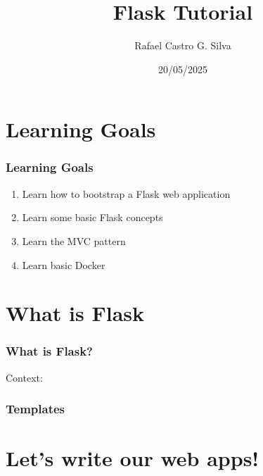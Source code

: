 \documentclass[fleqn,aspectratio=169,10pt]{beamer}
\title[Flask Tutorial]{Flask Tutorial}
\author[Rafael]{Rafael Castro G. Silva}
\date{20/05/2025}
\institute[UCPH]{
  Department of Computer Science \\
  University of Copenhagen}
\begin{document}

\begin{frame}
  \titlepage
\end{frame}

\section{Learning Goals}

\begin{frame}
  \frametitle{Learning Goals}
  \begin{enumerate}
    \item Learn how to bootstrap a Flask web application
    \item Learn some basic Flask concepts
    \item Learn the MVC pattern
    \item Learn basic Docker
  \end{enumerate}
\end{frame}

\section{What is Flask}

\begin{frame}[fragile]
  \frametitle{What is Flask?}
  \begin{block}{Context:}
  \begin{itemize}
  \end{itemize}
  \end{block}
\end{frame}

\begin{frame}
  \frametitle{Templates}

\end{frame}

\section{Let's write our web apps!}
\end{document}
